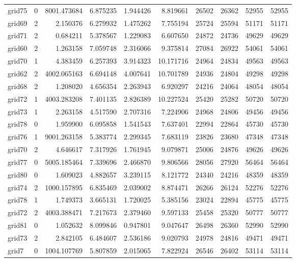 \begin{longtable}{|l|r|r|r|r|r|r|r|r|r|}
grid75 & 0 & 8001.473684 & 6.875235 & 1.944426 & 8.819661 & 26502 & 26362 & 52955 & 52955 \\
grid69 & 2 & 2.150376 & 6.279932 & 1.475262 & 7.755194 & 25724 & 25594 & 51171 & 51171 \\
grid71 & 2 & 0.684211 & 5.378567 & 1.229083 & 6.607650 & 24872 & 24736 & 49629 & 49629 \\
grid60 & 2 & 1.263158 & 7.059748 & 2.316066 & 9.375814 & 27084 & 26922 & 54061 & 54061 \\
grid70 & 1 & 4.383459 & 6.257393 & 3.914323 & 10.171716 & 24964 & 24834 & 49563 & 49563 \\
grid62 & 2 & 4002.065163 & 6.694148 & 4.007641 & 10.701789 & 24936 & 24804 & 49298 & 49298 \\
grid68 & 2 & 1.208020 & 4.656354 & 2.263943 & 6.920297 & 24216 & 24064 & 48054 & 48054 \\
grid72 & 1 & 4003.283208 & 7.401135 & 2.826389 & 10.227524 & 25420 & 25282 & 50720 & 50720 \\
grid73 & 1 & 2.263158 & 4.517590 & 2.707316 & 7.224906 & 24968 & 24806 & 49456 & 49456 \\
grid78 & 0 & 1.959900 & 6.095858 & 1.541543 & 7.637401 & 22994 & 22864 & 45730 & 45730 \\
grid76 & 1 & 9001.263158 & 5.383774 & 2.299345 & 7.683119 & 23826 & 23680 & 47348 & 47348 \\
grid70 & 2 & 4.646617 & 7.317926 & 1.761945 & 9.079871 & 25006 & 24876 & 49626 & 49626 \\
grid77 & 0 & 5005.185464 & 7.339696 & 2.466870 & 9.806566 & 28056 & 27920 & 56464 & 56464 \\
grid80 & 0 & 1.609023 & 4.882657 & 3.239115 & 8.121772 & 24340 & 24216 & 48359 & 48359 \\
grid74 & 2 & 1000.157895 & 6.835469 & 2.039002 & 8.874471 & 26266 & 26124 & 52276 & 52276 \\
grid78 & 1 & 1.749373 & 3.665131 & 1.720025 & 5.385156 & 23024 & 22894 & 45775 & 45775 \\
grid72 & 2 & 4003.388471 & 7.217673 & 2.379460 & 9.597133 & 25458 & 25320 & 50777 & 50777 \\
grid81 & 0 & 1.052632 & 8.099846 & 0.947801 & 9.047647 & 26498 & 26360 & 52990 & 52990 \\
grid73 & 2 & 2.842105 & 6.484607 & 2.536186 & 9.020793 & 24978 & 24816 & 49471 & 49471 \\
grid7 & 0 & 1004.107769 & 5.807859 & 2.015065 & 7.822924 & 26546 & 26402 & 53114 & 53114 \\

\end{longtable}

